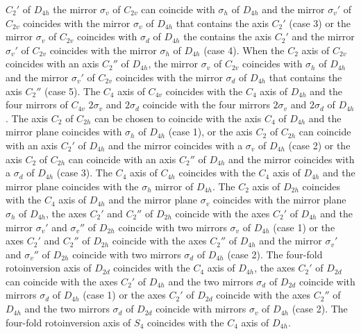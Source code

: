 \documentclass[12pt,a4paper]{article}
\begin{document}
$C_2'$ of $D_{4h}$ the mirror $\sigma_v$ of $C_{2v}$ can coincide with $\sigma_h$ of
$D_{4h}$ and the mirror $\sigma_v'$ of $C_{2v}$ coincides with the mirror
$\sigma_v$ of $D_{4h}$ that contains the axis $C_2'$ (case 3) or the mirror
$\sigma_v$ of $C_{2v}$ coincides with $\sigma_d$ of
$D_{4h}$ the contains the axis $C_2'$ and the mirror $\sigma_v'$ of $C_{2v}$ 
coincides with the mirror $\sigma_h$ of $D_{4h}$ (case 4). 
When the $C_2$ axis of $C_{2v}$ coincides with an axis $C_2''$
of $D_{4h}$, the mirror $\sigma_v$ of $C_{2v}$ coincides with $\sigma_h$ 
of $D_{4h}$ and the mirror $\sigma_v'$ of $C_{2v}$ coincides with the
mirror $\sigma_d$ of $D_{4h}$ that contains the axis $C_2''$ (case 5). 
The $C_4$ axis of $C_{4v}$ coincides with the $C_4$ axis of $D_{4h}$
and the four mirrors of $C_{4v}$ $2\sigma_v$ and $2\sigma_d$
coincide with the four mirrors $2\sigma_v$ and $2\sigma_d$ of $D_{4h}$. 
The axis $C_2$ of $C_{2h}$ can be chosen to coincide with the 
axis $C_4$ of $D_{4h}$ and the mirror plane coincides with
$\sigma_h$ of $D_{4h}$ (case 1), or the axis $C_2$ of $C_{2h}$ can
coincide with an axis $C_2'$ of $D_{4h}$ and the mirror coincides with a 
$\sigma_v$ of $D_{4h}$ (case 2) or the axis $C_2$ of $C_{2h}$ can 
coincide with an axis $C_2''$ of $D_{4h}$ and the mirror coincides with a 
$\sigma_d$ of $D_{4h}$ (case 3). 
The $C_4$ axis of $C_{4h}$ coincides with the $C_4$ axis of $D_{4h}$ and
the mirror plane coincides with the $\sigma_h$ mirror of $D_{4h}$. 
The $C_2$ axis of $D_{2h}$ coincides with the $C_4$ axis of $D_{4h}$
and the mirror plane $\sigma_v$ coincides with the mirror plane $\sigma_h$
of $D_{4h}$, the axes $C_2'$ and $C_2''$ of $D_{2h}$ coincide with the 
axes $C_2'$ of $D_{4h}$ and the mirror $\sigma_v'$ and $\sigma_v''$ of $D_{2h}$
coincide with two mirrors $\sigma_v$ of $D_{4h}$ (case 1) or 
the axes $C_2'$ and $C_2''$ of $D_{2h}$ coincide with the axes $C_2''$ of
$D_{4h}$ and the mirror $\sigma_v'$ and $\sigma_v''$ of $D_{2h}$ 
coincide with two mirrors $\sigma_d$ of $D_{4h}$ (case 2).
The four-fold rotoinversion axis of $D_{2d}$ coincides with the $C_4$ axis of 
$D_{4h}$, the axes $C_2'$ of $D_{2d}$ can coincide with the 
axes $C_2'$ of $D_{4h}$ and the two mirrors $\sigma_d$ of $D_{2d}$
coincide with mirrors $\sigma_d$ of $D_{4h}$ (case 1) or 
the axes $C_2'$ of $D_{2d}$ coincide with the axes $C_2''$ of
$D_{4h}$ and the two mirrors $\sigma_d$ of $D_{2d}$ 
coincide with mirrors $\sigma_v$ of $D_{4h}$ (case 2).
The four-fold rotoinversion axis of $S_4$ coincides with the $C_4$ axis of 
$D_{4h}$. \\
\end{document}
